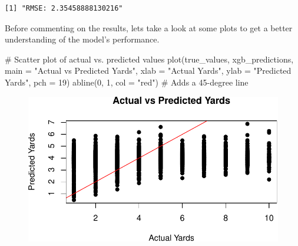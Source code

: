 \documentclass[
  super,
  preprint,
  3p]{elsarticle}
\newenvironment{Shaded}{\begin{snugshade}}{\end{snugshade}}
\newcommand{\AttributeTok}[1]{\textcolor[rgb]{0.40,0.45,0.13}{#1}}
\newcommand{\CommentTok}[1]{\textcolor[rgb]{0.37,0.37,0.37}{#1}}
\newcommand{\DecValTok}[1]{\textcolor[rgb]{0.68,0.00,0.00}{#1}}
\newcommand{\FunctionTok}[1]{\textcolor[rgb]{0.28,0.35,0.67}{#1}}
\newcommand{\NormalTok}[1]{\textcolor[rgb]{0.00,0.23,0.31}{#1}}
\newcommand{\OtherTok}[1]{\textcolor[rgb]{0.00,0.23,0.31}{#1}}
\newcommand{\SpecialCharTok}[1]{\textcolor[rgb]{0.37,0.37,0.37}{#1}}
\newcommand{\StringTok}[1]{\textcolor[rgb]{0.13,0.47,0.30}{#1}}
\begin{document}
\begin{Shaded}
\end{Shaded}

\begin{verbatim}
[1] "RMSE: 2.35458888130216"
\end{verbatim}

Before commenting on the results, lets take a look at some plots to get
a better understanding of the model's performance.

\begin{Shaded}
\begin{Highlighting}[]
\CommentTok{\# Scatter plot of actual vs. predicted values}
\FunctionTok{plot}\NormalTok{(true\_values, xgb\_predictions, }\AttributeTok{main =} \StringTok{"Actual vs Predicted Yards"}\NormalTok{, }\AttributeTok{xlab =} \StringTok{"Actual Yards"}\NormalTok{, }\AttributeTok{ylab =} \StringTok{"Predicted Yards"}\NormalTok{, }\AttributeTok{pch =} \DecValTok{19}\NormalTok{)}
\FunctionTok{abline}\NormalTok{(}\DecValTok{0}\NormalTok{, }\DecValTok{1}\NormalTok{, }\AttributeTok{col =} \StringTok{"red"}\NormalTok{)  }\CommentTok{\# Adds a 45{-}degree line}
\end{Highlighting}
\end{Shaded}

\begin{figure}[H]

{\centering \includegraphics{project_report_files/figure-pdf/unnamed-chunk-37-1.pdf}

}

\end{figure}
\end{document}
